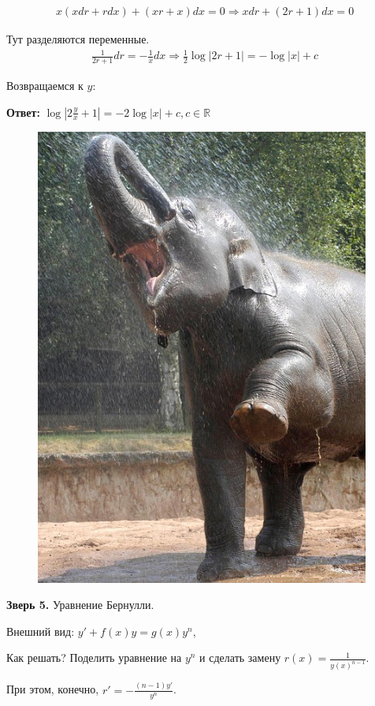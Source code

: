 \documentclass[10pt, a4paper]{article}
\begin{document}
\begin{eqnarray*}
x(xdr + rdx) + (xr + x) dx = 0 \Rightarrow xdr + (2r+1)dx = 0
\end{eqnarray*}
\par Тут разделяются переменные.
\begin{eqnarray*}
\frac{1}{2r + 1} dr = -\frac{1}{x} dx \Rightarrow \frac{1}{2}\log|2r + 1| = -\log|x| + c
\end{eqnarray*}
\par Возвращаемся к $y$:
\par \textbf{Ответ:} $\log|2\frac yx + 1| = -2\log|x| + c, c \in \mathbb{R}$ \\
\newpage
\pagecolor{Salmon}
\begin{figure}[h]
\centering
\includegraphics[width = 11cm]{eleph.jpg}
\end{figure}
\par \textbf{Зверь 5.} Уравнение Бернулли.
\par Внешний вид: $y' + f(x) y = g(x) y^n$,
\par Как решать? Поделить уравнение на $y^n$ и сделать замену $r(x) = \frac1 {y(x)^{n-1}}$.
\par При этом, конечно, $r' = - \frac{(n-1)y'}{y^n}$.
\end{document}
